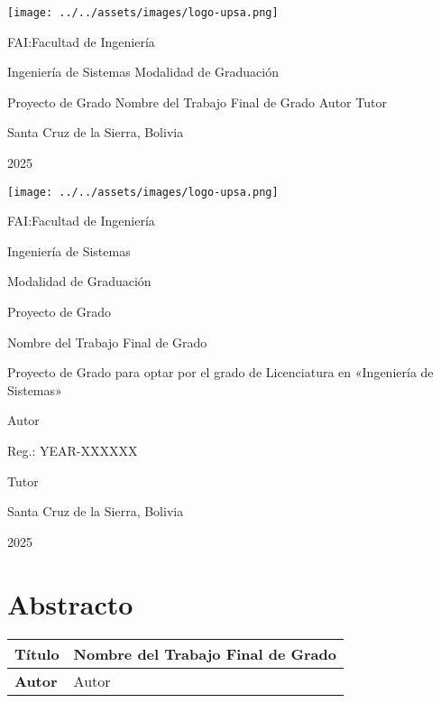 \documentclass{scrreprt}
\date{\today}
\begin{document}
\begin{titlepage}
  \centering
  \bfseries

  \texttt{[image: ../../assets/images/logo-upsa.png]}

  \vfill
  FAI:\@ Facultad de Ingeniería

  Ingeniería de Sistemas
  \vfill
  Modalidad de Graduación

  Proyecto de Grado
  \vfill
  Nombre del Trabajo Final de Grado
  \vfill
  Autor
  \vfill
  Tutor

  Santa Cruz de la Sierra, Bolivia

  2025
\end{titlepage}

\mbox{}
\newpage

\begin{titlepage}
  \centering
  \bfseries

  \texttt{[image: ../../assets/images/logo-upsa.png]}

  \vfill

  FAI:\@ Facultad de Ingeniería

  Ingeniería de Sistemas

  \vfill

  Modalidad de Graduación

  Proyecto de Grado

  \vfill

  Nombre del Trabajo Final de Grado

  \vfill

  Proyecto de Grado para optar por el grado de Licenciatura en «Ingeniería de Sistemas»

  \vfill

  Autor

  Reg.: YEAR-XXXXXX

  \vfill

  Tutor

  Santa Cruz de la Sierra, Bolivia

  2025
\end{titlepage}

\section*{Abstracto}
\begin{tabular}{ll}
  \toprule
  \textbf{Título} & Nombre del Trabajo Final de Grado \\
  \midrule
  \textbf{Autor} & Autor \\
  \bottomrule
\end{tabular}
\end{document}
